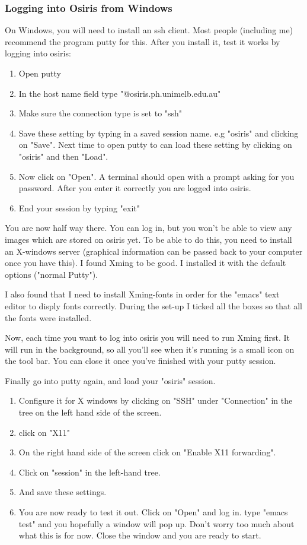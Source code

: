 \documentclass[]{cxs-software}
\begin{document}
\subsubsection{Logging into Osiris from Windows}

On Windows, you will need to install an ssh client. Most people
(including me) recommend the program putty for this.  After you
install it, test it works by logging into osiris:
\begin{enumerate}
\item Open putty 
\item In the host name field type "@osiris.ph.unimelb.edu.au" 
\item Make sure the connection type is set to "ssh" 
\item Save these setting by typing in a saved session name. e.g
  "osiris" and clicking on "Save". Next time to open putty to can load
  these setting by clicking on "osiris" and then "Load".
\item Now click on "Open". A terminal should open with a prompt asking
  for you password. After you enter it correctly you are logged into
  osiris.
\item End your session by typing "exit"
\end{enumerate}

You are now half way there. You can log in, but you won't be able to
view any images which are stored on osiris yet. To be able to do this,
you need to install an X-windows server (graphical information can be
passed back to your computer once you have this). I found Xming to be
good. I installed it with the default options ("normal Putty").

I also found that I need to install Xming-fonts in order for the
"emacs" text editor to disply fonts correctly. During the set-up I
ticked all the boxes so that all the fonts were installed.

Now, each time you want to log into osiris you will need to run Xming
first. It will run in the background, so all you'll see when it's
running is a small icon on the tool bar. You can close it once you've
finished with your putty session.

Finally go into putty again, and load your "osiris" session. 
\begin{enumerate}
\item Configure it for X windows by clicking on "SSH" under "Connection" in the tree on the left hand side of the screen. 
\item click on "X11" 
\item On the right hand side of the screen click on "Enable X11 forwarding". 
\item Click on "session" in the left-hand tree. 
\item And save these settings. 
\item You are now ready to test it out. Click on "Open" and log in. type "emacs test" and you hopefully a window will pop up. Don't worry too much about what this is for now. Close the window and you are ready to start.
\end{enumerate}
\end{document}
